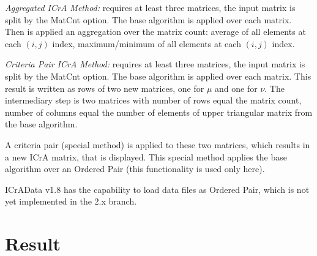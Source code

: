 \documentclass[11pt, a4paper]{article}
\begin{document}
\medskip
\textit{Aggregated ICrA Method:} requires at least three matrices, the input matrix is split by the MatCnt option.
The base algorithm is applied over each matrix.
Then is applied an aggregation over the matrix count: average of all elements at each $(i,j)$ index,
maximum/minimum of all elements at each $(i,j)$ index.

\medskip
\textit{Criteria Pair ICrA Method:} requires at least three matrices, the input matrix is split by the MatCnt option.
The base algorithm is applied over each matrix. This result is written as rows of two new matrices, one for $\mu$ and one for $\nu$.
The intermediary step is two matrices with number of rows equal the matrix count,
number of columns equal the number of elements of upper triangular matrix from the base algorithm.

A criteria pair (special method) is applied to these two matrices, which results in a new ICrA matrix, that is displayed.
This special method applies the base algorithm over an Ordered Pair (this functionality is used only here).

\medskip
ICrAData v1.8 has the capability to load data files as Ordered Pair, which is not yet implemented in the 2.x branch.


\section{Result}
\end{document}
